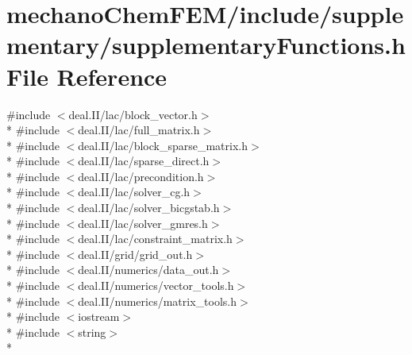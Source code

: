 \section{mechano\-Chem\-F\-E\-M/include/supplementary/supplementary\-Functions.h File Reference}
\label{supplementary_functions_8h}
{\ttfamily \#include $<$deal.\-I\-I/lac/block\-\_\-vector.\-h$>$}\\*
{\ttfamily \#include $<$deal.\-I\-I/lac/full\-\_\-matrix.\-h$>$}\\*
{\ttfamily \#include $<$deal.\-I\-I/lac/block\-\_\-sparse\-\_\-matrix.\-h$>$}\\*
{\ttfamily \#include $<$deal.\-I\-I/lac/sparse\-\_\-direct.\-h$>$}\\*
{\ttfamily \#include $<$deal.\-I\-I/lac/precondition.\-h$>$}\\*
{\ttfamily \#include $<$deal.\-I\-I/lac/solver\-\_\-cg.\-h$>$}\\*
{\ttfamily \#include $<$deal.\-I\-I/lac/solver\-\_\-bicgstab.\-h$>$}\\*
{\ttfamily \#include $<$deal.\-I\-I/lac/solver\-\_\-gmres.\-h$>$}\\*
{\ttfamily \#include $<$deal.\-I\-I/lac/constraint\-\_\-matrix.\-h$>$}\\*
{\ttfamily \#include $<$deal.\-I\-I/grid/grid\-\_\-out.\-h$>$}\\*
{\ttfamily \#include $<$deal.\-I\-I/numerics/data\-\_\-out.\-h$>$}\\*
{\ttfamily \#include $<$deal.\-I\-I/numerics/vector\-\_\-tools.\-h$>$}\\*
{\ttfamily \#include $<$deal.\-I\-I/numerics/matrix\-\_\-tools.\-h$>$}\\*
{\ttfamily \#include $<$iostream$>$}\\*
{\ttfamily \#include $<$string$>$}\\*
